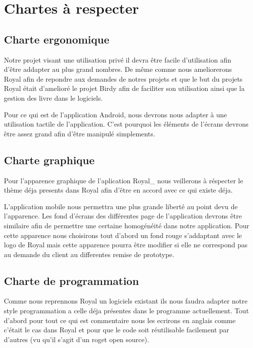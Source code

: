 \section{Chartes à respecter}

\subsection{Charte ergonomique}
Notre projet visant une utilisation privé il devra être facile d'utilisation afin d'être addapter au plus grand nombres.
De même comme nous ameliorerons Royal afin de repondre aux demandes de notres projets et que le but du projets Royal était d'amelioré le projet Birdy afin de faciliter son utilisation ainsi que la gestion des livre dans le logiciels.  

Pour ce qui est de l'application Android, nous devrons nous adapter à une utilisation tactile de l'application. 
C'est pourquoi les éléments de l'écrans devrons être assez grand afin d'être manipulé simplements. 

\subsection{Charte graphique}
Pour l'apparence graphique de l'aplication Royal\_ nous veillerons à réspecter le thème déja presents dans Royal afin d'être en accord avec ce qui existe déja.

L'application mobile nous permettra une plus grande liberté au point devu de l'apparence. 
Les fond d'écrans des différentes page de l'application devrons être similaire afin de permettre une certaine homogénéité dans notre application.
Pour cette apparence nous choisirons tout d'abord un fond rouge s'addaptant avec le logo de Royal mais cette apparence pourra être modifier si elle ne correspond pas au demande du client au differentes remise de prototype.

\subsection{Charte de programmation}

Comme nous reprennons Royal un logiciels existant ils nous faudra adapter notre style programmation a celle déja présentes dans le programme actuellement.
Tout d'abord pour tout ce qui est commentaire nous les ecrirons en anglais comme c'était le cas dans Royal et pour que le code soit réutilisable facilement par d'autres (vu qu'il s'agit d'un roget open source).

